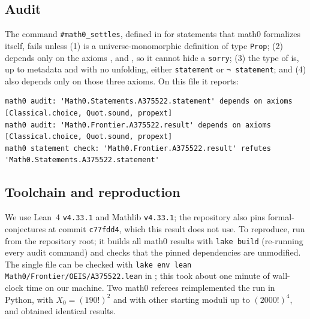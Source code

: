 \documentclass[11pt]{amsart}
\theoremstyle{plain}
\theoremstyle{definition}
\begin{document}
\subsection*{Audit}
The command \texttt{\#math0\_settles}, defined in  for statements that math0 formalizes itself, fails unless (1)  is a universe-monomorphic definition of type \texttt{Prop}; (2)  depends only on the axioms ,  and , so it cannot hide a \texttt{sorry}; (3) the type of  is, up to metadata and with no unfolding, either \texttt{statement} or \texttt{¬ statement}; and (4)  also depends only on those three axioms. On this file it reports:
\begin{lstlisting}[basicstyle=\ttfamily\scriptsize]
math0 audit: 'Math0.Statements.A375522.statement' depends on axioms [Classical.choice, Quot.sound, propext]
math0 audit: 'Math0.Frontier.A375522.result' depends on axioms [Classical.choice, Quot.sound, propext]
math0 statement check: 'Math0.Frontier.A375522.result' refutes 'Math0.Statements.A375522.statement'
\end{lstlisting}

\subsection*{Toolchain and reproduction}
We use Lean~4 \cite{Lean4} \texttt{v4.33.1} and Mathlib \cite{Mathlib} \texttt{v4.33.1}; the repository also pins formal-conjectures \cite{FC} at commit \texttt{c77fdd4}, which this result does not use. To reproduce, run  from the repository root; it builds all math0 results with \texttt{lake build} (re-running every audit command) and checks that the pinned dependencies are unmodified. The single file can be checked with \texttt{lake env lean Math0/Frontier/OEIS/A375522.lean} in ; this took about one minute of wall-clock time on our machine.
Two math0 referees reimplemented the run in Python, with $X_0=(190!)^2$ and with other starting moduli up to $(2000!)^4$, and obtained identical results.
\end{document}
